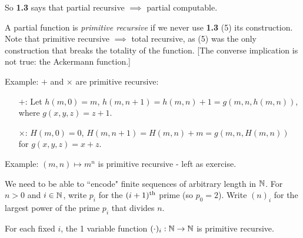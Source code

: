 \documentclass[10pt,a4paper]{article}
\begin{document}
So \textbf{1.3} says that partial recursive $\implies$ partial computable.

A partial function is \emph{primitive recursive} if we never use \textbf{1.3} (5) its construction. Note that primitive recursive $\implies$ total recursive, as (5) was the only construction that breaks the totality of the function. [The converse implication is not true: the Ackermann function.]

Example: $+$ and $\times$ are primitive recursive:
\begin{itemize}
\item[$+$:] Let $h(m,0) = m$, $h(m,n+1) = h(m,n) + 1 = g(m,n,h(m,n))$, where $g(x,y,z) = z+1$.
\item[$\times$:] $H(m,0) = 0$, $H(m,n+1) = H(m,n) + m = g(m,n,H(m,n))$ for $g(x,y,z) = x+z$.
\end{itemize}
Example: $(m,n)\mapsto m^n$ is primitive recursive - left as exercise.

We need to be able to ``encode" finite sequences of arbitrary length in $\mathbb{N}$. For $n>0$ and $i\in\mathbb{N}$, write $p_i$ for the $(i+1)\textsuperscript{th}$ prime (so $p_0 = 2$). Write $(n)_i$ for the largest power of the prime $p_i$ that divides $n$.

\begin{lemma}
For each fixed $i$, the 1 variable function $(\cdot)_i : \mathbb{N} \rightarrow \mathbb{N}$ is primitive recursive.
\end{lemma}
\end{document}
